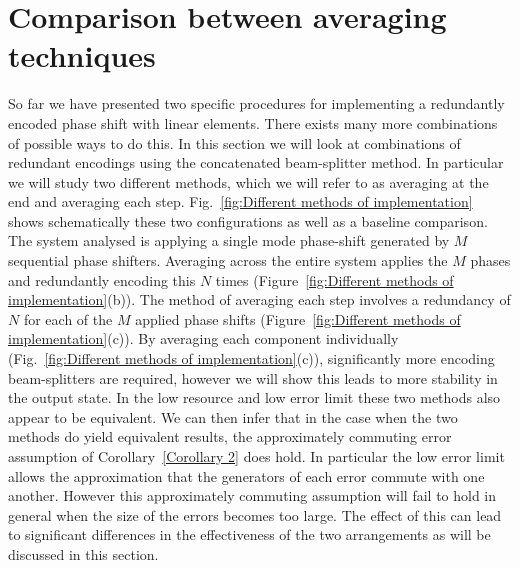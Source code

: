 \documentclass[aps,pra,twocolumn,superscriptaddress,numerical,floatfix]{revtex4-1}
\begin{document}
\section{Comparison between averaging techniques \label{averaging at end vs step}}

So far we have presented two specific procedures for implementing a redundantly encoded phase shift with linear elements.  There exists many more combinations of possible ways to do this.  In this section we will look at combinations of redundant encodings using the concatenated beam-splitter method.  In particular we will study two different methods, which we will refer to as averaging at the end and averaging each step. Fig.~\ref{fig:Different methods of implementation} shows schematically these two configurations as well as a baseline comparison. The system analysed is applying a single mode phase-shift generated by $M$ sequential phase shifters.  Averaging across the entire system applies the $M$ phases and redundantly encoding this $N$ times (Figure~\ref{fig:Different methods of implementation}(b)). The method of averaging each step involves a redundancy of $N$ for each of the $M$ applied phase shifts (Figure~\ref{fig:Different methods of implementation}(c)).  By averaging each component individually (Fig.~\ref{fig:Different methods of implementation}(c)), significantly more encoding beam-splitters are required, however we will show this leads to more stability in the output state. In the low resource and low error limit these two methods also appear to be equivalent. We can then infer that in the case when the two methods do yield equivalent results, the  approximately commuting error assumption of Corollary~\ref{Corollary 2} does hold. In particular the low error limit allows the approximation that the generators of each error commute with one another. However this approximately commuting assumption will fail to hold in general when the size of the errors becomes too large. The effect of this can lead to significant differences in the effectiveness of the two arrangements as will be discussed in this section.
\end{document}
